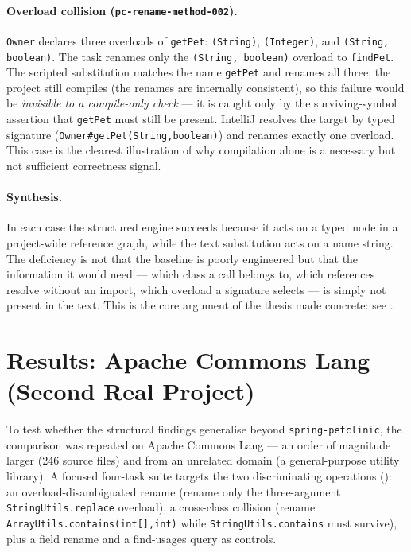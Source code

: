 \paragraph{Overload collision (\texttt{pc-rename-method-002}).}
\texttt{Owner} declares three overloads of \texttt{getPet}: \texttt{(String)},
\texttt{(Integer)}, and \texttt{(String, boolean)}. The task renames only the
\texttt{(String, boolean)} overload to \texttt{findPet}. The scripted substitution
matches the name \texttt{getPet} and renames all three; the project still compiles
(the renames are internally consistent), so this failure would be \emph{invisible
to a compile-only check} --- it is caught only by the surviving-symbol assertion
that \texttt{getPet} must still be present. IntelliJ resolves the target by typed
signature (\texttt{Owner\#getPet(String,boolean)}) and renames exactly one
overload. This case is the clearest illustration of why compilation alone is a
necessary but not sufficient correctness signal.

\paragraph{Synthesis.} In each case the structured engine succeeds because it acts
on a typed node in a project-wide reference graph, while the text substitution acts
on a name string. The deficiency is not that the baseline is poorly engineered but
that the information it would need --- which class a call belongs to, which
references resolve without an import, which overload a signature selects --- is
simply not present in the text. This is the core argument of the thesis made
concrete: see .

\section{Results: Apache Commons Lang (Second Real Project)}
\label{sec:eval-commons}
To test whether the structural findings generalise beyond \texttt{spring-petclinic},
the comparison was repeated on Apache Commons Lang --- an order of magnitude larger
(246 source files) and from an unrelated domain (a general-purpose utility library).
A focused four-task suite targets the two discriminating operations
(): an overload-disambiguated rename (rename only the
three-argument \texttt{StringUtils.replace} overload), a cross-class collision
(rename \texttt{ArrayUtils.contains(int[],int)} while \texttt{StringUtils.contains}
must survive), plus a field rename and a find-usages query as controls.

